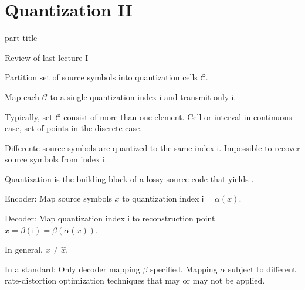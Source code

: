 
\DeclareMathOperator{\cwd}{codeword}
\newtheorem{proposition}{Proposition}
\usepackage{forest}
\usepackage{lipsum}
\usepackage{subcaption}
\usepackage{mathtools}







\section{Quantization II} 
\begin{frame}
 \vspace{12.0ex}
\begin{center}
\begin{beamercolorbox}[sep=12pt,center]{part title}
\insertsection\par
\end{beamercolorbox}
\end{center}
\end{frame}

\begin{frame}{Review of last lecture I}
\bit
\item Partition set of source symbols into quantization cells $\mathcal{C}$. 
\item Map each $\mathcal{C}$ to a single quantization index $\mathsf{i}$ and transmit only $\mathsf{i}$. 
\item Typically, set $\mathcal{C}$ consist of more than one element. Cell or interval in continuous case, set of points in 
the discrete case. 
\item [\iarrow] Differente source symbols are quantized to the same index $\mathsf{i}$. Impossible to recover source symbols from index $\mathsf{i}$. 
\item [\iarrow] Quantization is the building block of a lossy source code that yields .
\eit
{}
\bit
\item Encoder: Map source symbols $x$ to quantization index $\mathsf{i}=\alpha(x)$.
\item Decoder: Map quantization index $\mathsf{i}$ to reconstruction point $\hat{x}=\beta(\mathsf{i})=\beta(\alpha(x))$.
\item In general, $x\neq \hat{x}$.
\item In a standard: Only decoder mapping $\beta$ specified. Mapping $\alpha$ subject to different rate-distortion optimization techniques that 
may or may not be applied. 
\eit
\end{frame}


